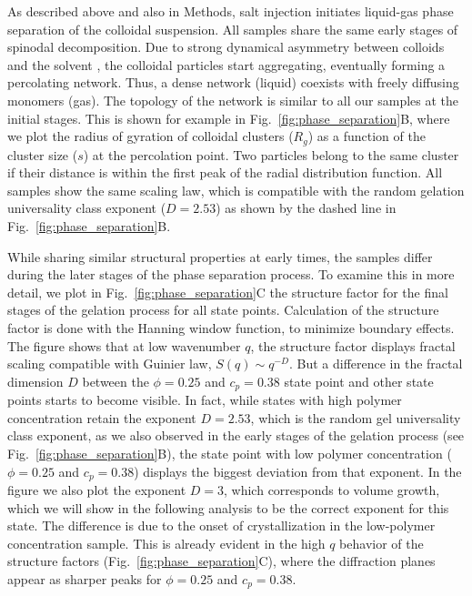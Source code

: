 \documentclass[12pt]{article}
\begin{document}
As described above and also in Methods, salt injection initiates liquid-gas phase separation of the colloidal suspension. 
All samples share the same early stages of spinodal decomposition. 
Due to strong dynamical asymmetry between colloids and the solvent \cite{tanaka1999colloid}, the colloidal particles start aggregating, 
eventually forming a percolating network. Thus, a dense network (liquid) coexists with freely diffusing monomers (gas). 
The topology of the network is similar to all our samples at the initial stages.
This is shown for example in Fig.~\ref{fig:phase_separation}B, where we plot the radius of gyration of colloidal clusters ($R_g$)
as a function of the cluster size ($s$) at the percolation point. Two particles belong to the same cluster if their distance is
within the first peak of the radial distribution function. All samples show the same scaling law, which is compatible with
the random gelation universality class exponent ($D=2.53$) as shown by the dashed line in Fig.~\ref{fig:phase_separation}B.

While sharing similar structural properties at early times, the samples differ during the later stages of the phase separation process.
To examine this in more detail, we plot in Fig.~\ref{fig:phase_separation}C the structure factor for the final stages of the gelation process for all state points.
Calculation of the structure factor is done with the Hanning window function, to minimize boundary effects.
The figure shows that at low wavenumber $q$, the structure factor displays fractal scaling compatible with Guinier law, $S(q)\sim q^{-D}$.
But a difference
in the fractal dimension $D$ between the $\phi=0.25$ and $c_p=0.38$ state point and other state points starts to become visible. In fact, while states
with high polymer concentration retain the exponent $D=2.53$,
which is the random gel universality class exponent, as we also observed in the early stages of the gelation process (see Fig.~\ref{fig:phase_separation}B),
the state point with low polymer concentration ($\phi=0.25$ and $c_p=0.38$) displays the biggest deviation from that exponent. In the figure we also
plot the exponent $D=3$, which corresponds to volume growth, which we will show in the following analysis to be the correct exponent for this state.
The difference is due to the onset of crystallization in the low-polymer concentration sample. This is already evident in the high $q$ behavior of
the structure factors (Fig.~\ref{fig:phase_separation}C), where the diffraction planes appear as sharper peaks for $\phi=0.25$ and $c_p=0.38$.
\end{document}
